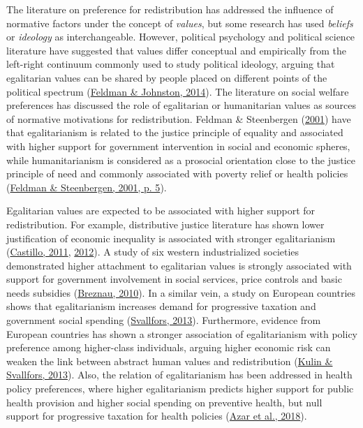 \documentclass[
  12pt,
]{book}
\begin{document}
The literature on preference for redistribution has addressed the influence of normative factors under the concept of \emph{values}, but some research has used \emph{beliefs} or \emph{ideology} as interchangeable. However, political psychology and political science literature have suggested that values differ conceptual and empirically from the left-right continuum commonly used to study political ideology, arguing that egalitarian values can be shared by people placed on different points of the political spectrum (\protect\hyperlink{ref-feldman_understanding_2014}{Feldman \& Johnston, 2014}). The literature on social welfare preferences has discussed the role of egalitarian or humanitarian values as sources of normative motivations for redistribution. Feldman \& Steenbergen (\protect\hyperlink{ref-feldman_humanitarian_2001}{2001}) have that egalitarianism is related to the justice principle of equality and associated with higher support for government intervention in social and economic spheres, while humanitarianism is considered as a prosocial orientation close to the justice principle of need and commonly associated with poverty relief or health policies (\protect\hyperlink{ref-feldman_humanitarian_2001}{Feldman \& Steenbergen, 2001, p. 5}).

Egalitarian values are expected to be associated with higher support for redistribution. For example, distributive justice literature has shown lower justification of economic inequality is associated with stronger egalitarianism (\protect\hyperlink{ref-Castillo2011}{Castillo, 2011}, \protect\hyperlink{ref-Castillo2012b_multidimentional}{2012}). A study of six western industrialized societies demonstrated higher attachment to egalitarian values is strongly associated with support for government involvement in social services, price controls and basic needs subsidies (\protect\hyperlink{ref-breznau_economic_2010}{Breznau, 2010}). In a similar vein, a study on European countries shows that egalitarianism increases demand for progressive taxation and government social spending (\protect\hyperlink{ref-svallfors_government_2013}{Svallfors, 2013}). Furthermore, evidence from European countries has shown a stronger association of egalitarianism with policy preference among higher-class individuals, arguing higher economic risk can weaken the link between abstract human values and redistribution (\protect\hyperlink{ref-Kulin2013}{Kulin \& Svallfors, 2013}). Also, the relation of egalitarianism has been addressed in health policy preferences, where higher egalitarianism predicts higher support for public health provision and higher social spending on preventive health, but null support for progressive taxation for health policies (\protect\hyperlink{ref-Azaretal2018}{Azar et al., 2018}).
\end{document}
